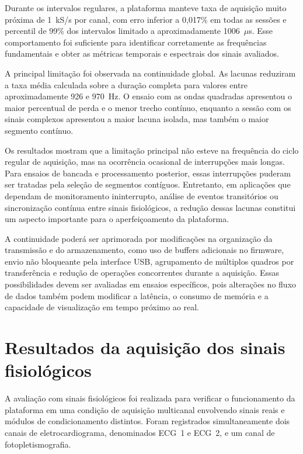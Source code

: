 \documentclass[a4paper,12pt]{fcte}
\begin{document}
Durante os intervalos regulares, a plataforma manteve taxa de aquisição muito próxima de 1~kS/s por canal, com erro inferior a 0,017\% em todas as sessões e percentil de 99\% dos intervalos limitado a aproximadamente 1006~$\mu$s. Esse comportamento foi suficiente para identificar corretamente as frequências fundamentais e obter as métricas temporais e espectrais dos sinais avaliados.

A principal limitação foi observada na continuidade global. As lacunas reduziram a taxa média calculada sobre a duração completa para valores entre aproximadamente 926 e 970~Hz. O ensaio com as ondas quadradas apresentou o maior percentual de perda e o menor trecho contínuo, enquanto a sessão com os sinais complexos apresentou a maior lacuna isolada, mas também o maior segmento contínuo.

Os resultados mostram que a limitação principal não esteve na frequência do ciclo regular de aquisição, mas na ocorrência ocasional de interrupções mais longas. Para ensaios de bancada e processamento posterior, essas interrupções puderam ser tratadas pela seleção de segmentos contíguos. Entretanto, em aplicações que dependam de monitoramento ininterrupto, análise de eventos transitórios ou sincronização contínua entre sinais fisiológicos, a redução dessas lacunas constitui um aspecto importante para o aperfeiçoamento da plataforma.

A continuidade poderá ser aprimorada por modificações na organização da transmissão e do armazenamento, como uso de buffers adicionais no firmware, envio não bloqueante pela interface USB, agrupamento de múltiplos quadros por transferência e redução de operações concorrentes durante a aquisição. Essas possibilidades devem ser avaliadas em ensaios específicos, pois alterações no fluxo de dados também podem modificar a latência, o consumo de memória e a capacidade de visualização em tempo próximo ao real.

\section{Resultados da aquisição dos sinais fisiológicos}
\label{sec:resultados_sinais_fisiologicos}

A avaliação com sinais fisiológicos foi realizada para verificar o funcionamento da plataforma em uma condição de aquisição multicanal envolvendo sinais reais e módulos de condicionamento distintos. Foram registrados simultaneamente dois canais de eletrocardiograma, denominados ECG~1 e ECG~2, e um canal de fotopletismografia.
\end{document}
